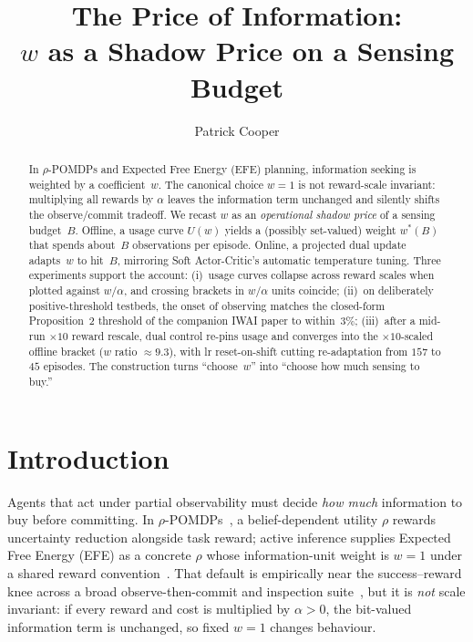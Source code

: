 \documentclass[runningheads]{llncs}
\begin{document}
\title{The Price of Information:\\
$w$ as a Shadow Price on a Sensing Budget}


\author{Patrick Cooper}



\maketitle

\begin{abstract}
In $\rho$-POMDPs and Expected Free Energy (EFE) planning, information seeking is weighted by a coefficient~$w$. The canonical choice $w{=}1$ is not reward-scale invariant: multiplying all rewards by $\alpha$ leaves the information term unchanged and silently shifts the observe/commit tradeoff. We recast $w$ as an \emph{operational shadow price} of a sensing budget~$B$. Offline, a usage curve $U(w)$ yields a (possibly set-valued) weight $w^*(B)$ that spends about~$B$ observations per episode. Online, a projected dual update adapts~$w$ to hit~$B$, mirroring Soft Actor-Critic's automatic temperature tuning. Three experiments support the account: (i)~usage curves collapse across reward scales when plotted against $w/\alpha$, and crossing brackets in $w/\alpha$ units coincide; (ii)~on deliberately positive-threshold testbeds, the onset of observing matches the closed-form Proposition~2 threshold of the companion IWAI paper to within~$3\%$; (iii)~after a mid-run $\times 10$ reward rescale, dual control re-pins usage and converges into the $\times 10$-scaled offline bracket ($w$ ratio $\approx 9.3$), with lr reset-on-shift cutting re-adaptation from $157$ to $45$ episodes. The construction turns ``choose~$w$'' into ``choose how much sensing to buy.''
\end{abstract}

\section{Introduction}

Agents that act under partial observability must decide \emph{how much} information to buy before committing. In $\rho$-POMDPs~\citep{araya2010}, a belief-dependent utility $\rho$ rewards uncertainty reduction alongside task reward; active inference supplies Expected Free Energy (EFE) as a concrete $\rho$ whose information-unit weight is $w{=}1$ under a shared reward convention~\citep{friston2015,parr2019}. That default is empirically near the success--reward knee across a broad observe-then-commit and inspection suite~\citep{cooper2026efe}, but it is \emph{not} scale invariant: if every reward and cost is multiplied by $\alpha>0$, the bit-valued information term is unchanged, so fixed $w{=}1$ changes behaviour.
\end{document}
